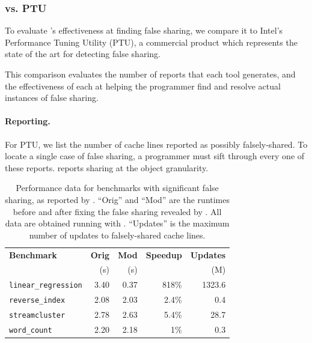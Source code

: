 \subsubsection{\sheriffdetect{} vs. PTU}
\label{evaluation:comparison}


To evaluate \sheriffdetect{}'s effectiveness at finding false
sharing, we compare it to Intel's Performance Tuning
Utility (PTU), a commercial product which represents
the state of the art for detecting false sharing.

This comparison evaluates the number of reports that each tool
generates, and the effectiveness of each at helping the programmer
find and resolve actual instances of false sharing.

\paragraph{Reporting.}
For PTU, we list the number of cache lines reported as possibly
falsely-shared. To locate a single case of false sharing, a programmer
must sift through every one of these reports. \sheriffdetect{}
reports sharing at the object granularity.


\begin{table}
\centering
\begin{tabular}{l|r|r|r|r}
\hline
{\bf \small Benchmark} & {\bf \small Orig} & {\bf \small Mod} & {\bf \small Speedup} & {\bf \small Updates}\\
& (s) & (s) & & (M)\\
\hline
\small \texttt{linear\_regression} & 3.40 & 0.37 & 818\% & 1323.6\\
\small \texttt{reverse\_index} & 2.08 & 2.03  & 2.4\% & 0.4\\
\small \texttt{streamcluster} & 2.78 & 2.63 & 5.4\% & 28.7\\
\small \texttt{word\_count} & 2.20 & 2.18 & 1\% & 0.3\\
\hline
\end{tabular}
\caption{Performance data for benchmarks with significant false sharing, as reported by \sheriffdetect{}. 
``Orig'' and ``Mod'' are the runtimes before and after fixing the false sharing
revealed by \sheriffdetect{}.
All data are obtained running with \pthreads{}.
``Updates'' is the maximum number of updates to falsely-shared cache lines.
\label{table:perfafterfix}}
\end{table}

